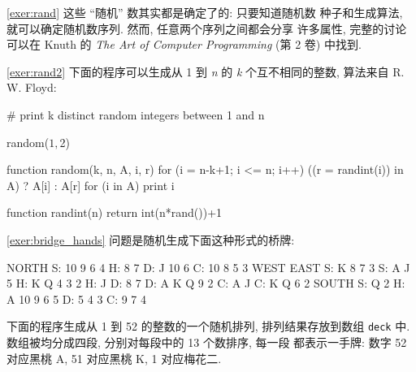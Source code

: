 \myexer\ref{exer:rand} 这些 ``随机'' 数其实都是确定了的: 只要知道随机数
种子和生成算法, 就可以确定随机数序列. 然而, 任意两个序列之间都会分享
许多属性, 完整的讨论可以在 Knuth 的 \textit{The Art of Computer
Programming} (第 2 卷) 中找到.

\myexer\ref{exer:rand2}  下面的程序可以生成从 1 到 \textit{n} 的 \textit{k}
个互不相同的整数, 算法来自 R. W. Floyd:
\begin{awkcode}
    # print k distinct random integers between 1 and n

    { random($1, $2) }

    function random(k, n,    A, i, r) {
        for (i = n-k+1; i <= n; i++)
            ((r = randint(i)) in A) ? A[i] : A[r]
        for (i in A)
            print i
    }

    function randint(n) { return int(n*rand())+1 }
\end{awkcode}

\myexer\ref{exer:bridge_hands} 问题是随机生成下面这种形式的桥牌:
\begin{file}
                        NORTH
                    S: 10 9 6 4
                    H: 8 7
                    D: J 10 6
                    C: 10 8 5 3
       WEST                                 EAST
    S: K 8 7 3                           S: A J 5
    H: K Q 4 3 2                         H: J
    D: 8 7                               D: A K Q 9 2
    C: A J                               C: K Q 6 2
                        SOUTH
                    S: Q 2
                    H: A 10 9 6 5
                    D: 5 4 3
                    C: 9 7 4
\end{file}
下面的程序生成从 1 到 52 的整数的一个随机排列, 排列结果存放到数组
\texttt{deck} 中. 数组被均分成四段, 分别对每段中的 13 个数排序, 每一段
都表示一手牌: 数字 52 对应黑桃 A, 51 对应黑桃 K, 1 对应梅花二.


